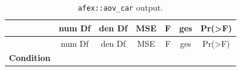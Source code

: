 \documentclass[]{article}
\begin{document}
\begin{longtable}[]{@{}ccccccc@{}}
\caption{\texttt{afex::aov\_car} output.}\tabularnewline
\toprule
\begin{minipage}[b]{0.22\columnwidth}\centering
~\strut
\end{minipage} & \begin{minipage}[b]{0.10\columnwidth}\centering
num Df\strut
\end{minipage} & \begin{minipage}[b]{0.10\columnwidth}\centering
den Df\strut
\end{minipage} & \begin{minipage}[b]{0.09\columnwidth}\centering
MSE\strut
\end{minipage} & \begin{minipage}[b]{0.09\columnwidth}\centering
F\strut
\end{minipage} & \begin{minipage}[b]{0.10\columnwidth}\centering
ges\strut
\end{minipage} & \begin{minipage}[b]{0.13\columnwidth}\centering
Pr(\textgreater{}F)\strut
\end{minipage}\tabularnewline
\midrule
\endfirsthead
\toprule
\begin{minipage}[b]{0.22\columnwidth}\centering
~\strut
\end{minipage} & \begin{minipage}[b]{0.10\columnwidth}\centering
num Df\strut
\end{minipage} & \begin{minipage}[b]{0.10\columnwidth}\centering
den Df\strut
\end{minipage} & \begin{minipage}[b]{0.09\columnwidth}\centering
MSE\strut
\end{minipage} & \begin{minipage}[b]{0.09\columnwidth}\centering
F\strut
\end{minipage} & \begin{minipage}[b]{0.10\columnwidth}\centering
ges\strut
\end{minipage} & \begin{minipage}[b]{0.13\columnwidth}\centering
Pr(\textgreater{}F)\strut
\end{minipage}\tabularnewline
\midrule
\endhead
\begin{minipage}[t]{0.22\columnwidth}\centering
\textbf{Condition}\strut
\end{minipage} & \begin{minipage}[t]{0.10\columnwidth}\centering

\end{minipage}
\end{longtable}
\end{document}
